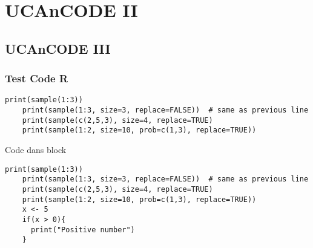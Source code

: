 \documentclass[10pt]{beamer}
\begin{document}
\section{UCAnCODE II}
\subsection{UCAnCODE III}


\begin{frame}[fragile]
  \frametitle{Test Code R}
  \begin{lstlisting}[caption={My Caption}]
    print(sample(1:3))
    print(sample(1:3, size=3, replace=FALSE))  # same as previous line
    print(sample(c(2,5,3), size=4, replace=TRUE)
    print(sample(1:2, size=10, prob=c(1,3), replace=TRUE))    
  \end{lstlisting}


  \begin{exampleblock}{Code dans block}
      \begin{lstlisting}
print(sample(1:3))
    print(sample(1:3, size=3, replace=FALSE))  # same as previous line
    print(sample(c(2,5,3), size=4, replace=TRUE)
    print(sample(1:2, size=10, prob=c(1,3), replace=TRUE))
    x <- 5
    if(x > 0){
      print("Positive number")
    }
  \end{lstlisting}
  \end{exampleblock}
\end{frame}


 \questionSlide

\appendix



\end{document}

